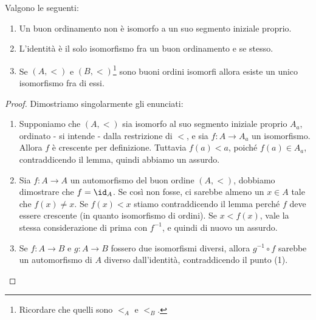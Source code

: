 \documentclass[11pt]{scrartcl}
\begin{document}
\begin{corollary}
	Valgono le seguenti:
	\begin{enumerate}[(1)]
		\item Un buon ordinamento non è isomorfo a un suo segmento iniziale proprio.
		\item L'identità è il solo isomorfismo fra un buon ordinamento e se stesso.
		\item Se $(A,<)$ e $(B,<)$\footnote{Ricordare che quelli sono $<_A$ e $<_B$.} sono buoni ordini isomorfi allora esiste un unico isomorfismo fra di essi.
	\end{enumerate}
\end{corollary}

\begin{proof}
	Dimostriamo singolarmente gli enunciati:
	\begin{enumerate}[(1)]
		\item Supponiamo che $(A,<)$ sia isomorfo al suo segmento iniziale proprio $A_a$, ordinato - si intende - dalla restrizione di $<$, e sia $f : A \rightarrow A_a$ un isomorfismo.
		Allora $f$ è crescente per definizione. Tuttavia $f(a) < a$, poiché $f(a) \in A_a$, contraddicendo il lemma, quindi abbiamo un assurdo.
		\item Sia $f : A \rightarrow A$ un automorfismo del buon ordine $(A,<)$, dobbiamo dimostrare che $f = \id_A$. Se così non fosse, ci sarebbe almeno un $x \in A$ tale che $f(x) \ne x$.
		Se $f(x) < x$ stiamo contraddicendo il lemma perché $f$ deve essere crescente (in quanto isomorfismo di ordini). Se $x < f(x)$, vale la stessa considerazione di prima con $f^{-1}$, e quindi di nuovo un assurdo.
		\item Se $f : A \rightarrow B$ e $g : A \rightarrow B$ fossero due isomorfismi diversi, allora $g^{-1} \circ f$ sarebbe un automorfismo di $A$ diverso dall'identità,
		contraddicendo il punto (1).	
	\end{enumerate}
\end{proof}
\end{document}
